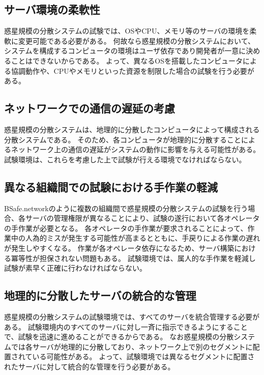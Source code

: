 \subsection{サーバ環境の柔軟性}
\label{issue:requirements1}

惑星規模の分散システムの試験では、OSやCPU、メモリ等のサーバの環境を柔軟に変更可能である必要がある。
何故なら惑星規模の分散システムにおいて、システムを構成するコンピュータの環境はユーザ依存であり開発者が一意に決めることはできないからである。
よって、異なるOSを搭載したコンピュータによる協調動作や、CPUやメモリといった資源を制限した場合の試験を行う必要がある。

\subsection{ネットワークでの通信の遅延の考慮}
\label{issue:requirements2}

惑星規模の分散システムは、地理的に分散したコンピュータによって構成される分散システムである。
そのため、各コンピュータが地理的に分散することによるネットワーク上の通信の遅延がシステムの動作に影響を与える可能性がある。
試験環境は、これらを考慮した上で試験が行える環境でなければならない。

\subsection{異なる組織間での試験における手作業の軽減}
\label{issue:requirements3}

BSafe.networkのように複数の組織間で惑星規模の分散システムの試験を行う場合、各サーバの管理権限が異なることにより、試験の遂行において各オペレータの手作業が必要となる。
各オペレータの手作業が要求されることによって、作業中の人為的ミスが発生する可能性が高まるとともに、手戻りによる作業の遅れが発生しやすくなる。
作業が各オペレータ依存になるため、サーバ構築における冪等性が担保されない問題もある。
試験環境では、属人的な手作業を軽減し試験が素早く正確に行わなければならない。

\subsection{地理的に分散したサーバの統合的な管理}
\label{issue:requirements4}

惑星規模の分散システムの試験環境では、すべてのサーバを統合管理する必要がある。
試験環境内のすべてのサーバに対し一斉に指示できるようにすることで、試験を迅速に進めることができるからである。
なお惑星規模の分散システムでは各サーバが地理的に分散しており、ネットワーク上で別のセグメントに配置されている可能性がある。
よって、試験環境では異なるセグメントに配置されたサーバに対して統合的な管理を行う必要がある。

